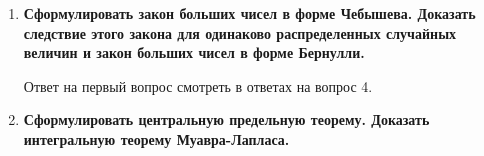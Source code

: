 \documentclass[12pt]{report}
\begin{document}
\begin{enumerate}
\begin{figure}[!h]
	\end{figure}
	\item \textbf{Сформулировать закон больших чисел в форме Чебышева. Доказать следствие этого закона
		для одинаково распределенных случайных величин и закон больших чисел в форме Бернулли.}
	
		Ответ на первый вопрос смотреть в ответах на вопрос 4.
		\begin{figure}[!h]
		\end{figure}
	\item \textbf{Сформулировать центральную предельную теорему. Доказать интегральную теорему
		Муавра-Лапласа.}
	\begin{figure}[!h]

\end{figure}
\end{enumerate}
\end{document}
